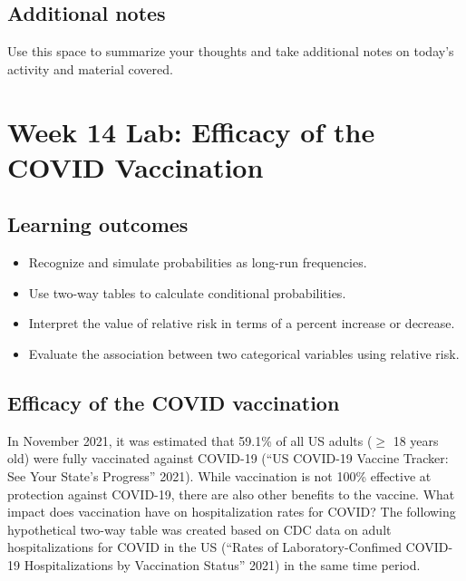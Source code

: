 \documentclass[
]{report}
\begin{document}
\hypertarget{additional-notes-22}{%
\subsection{Additional notes}\label{additional-notes-22}}

Use this space to summarize your thoughts and take additional notes on today's activity and material covered.

\newpage

\hypertarget{week-14-lab-efficacy-of-the-covid-vaccination}{%
\section{Week 14 Lab: Efficacy of the COVID Vaccination}\label{week-14-lab-efficacy-of-the-covid-vaccination}}


\hypertarget{learning-outcomes-30}{%
\subsection{Learning outcomes}\label{learning-outcomes-30}}

\begin{itemize}
\item
  Recognize and simulate probabilities as long-run frequencies.
\item
  Use two-way tables to calculate conditional probabilities.
\item
  Interpret the value of relative risk in terms of a percent increase or decrease.
\item
  Evaluate the association between two categorical variables using relative risk.
\end{itemize}

\hypertarget{efficacy-of-the-covid-vaccination}{%
\subsection{Efficacy of the COVID vaccination}\label{efficacy-of-the-covid-vaccination}}

In November 2021, it was estimated that 59.1\% of all US adults (\(\ge\) 18 years old) were fully vaccinated against COVID-19 ({``US COVID-19 Vaccine Tracker: See Your State's Progress''} 2021). While vaccination is not 100\% effective at protection against COVID-19, there are also other benefits to the vaccine. What impact does vaccination have on hospitalization rates for COVID? The following hypothetical two-way table was created based on CDC data on adult hospitalizations for COVID in the US ({``Rates of Laboratory-Confimed COVID-19 Hospitalizations by Vaccination Status''} 2021) in the same time period.
\end{document}
